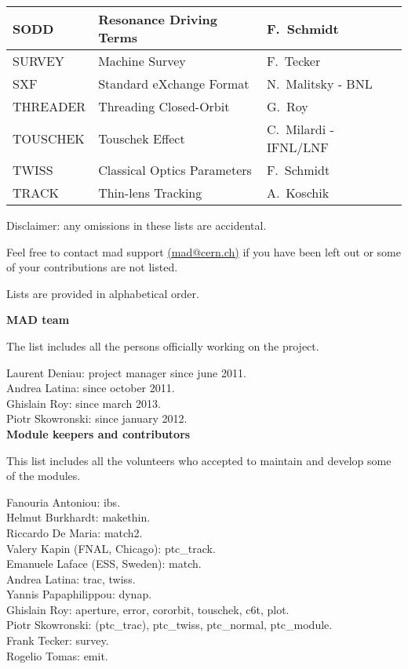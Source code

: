 \begin{table}[H]
\begin{center}
\begin{tabular}{|l|l|l|}
      SODD               &Resonance Driving Terms     &F.~Schmidt \\\hline
      SURVEY             &Machine Survey              &F.~Tecker \\\hline
      SXF                &Standard eXchange Format    &N.~Malitsky - BNL  \\\hline
      THREADER           &Threading Closed-Orbit      &G.~Roy \\\hline
      TOUSCHEK           &Touschek Effect             &C.~Milardi - IFNL/LNF \\\hline
      TWISS              &Classical Optics Parameters &F.~Schmidt \\\hline
      TRACK              &Thin-lens Tracking          &A.~Koschik \\\hline      
    \end{tabular}
    \label{Module_Keepers}
  \end{center}
\end{table}


Disclaimer: any omissions in these lists are accidental. 

Feel free to contact mad support
\href{mailto:mad.support@cern.ch}{(mad@cern.ch)} 
if you have been left out or some of your contributions are not listed. 

Lists are provided in alphabetical order.

{\bf MAD team}

The list includes all the persons officially working on the \madx project.

Laurent Deniau: project manager since june 2011.\\
Andrea Latina: since october 2011.\\
Ghislain Roy: since march 2013.\\
Piotr Skowronski: since january 2012.\\


{\bf Module keepers and contributors}

This list includes all the volunteers who accepted to maintain and
develop some of the \madx modules.

Fanouria Antoniou: ibs.\\
Helmut Burkhardt: makethin.\\
Riccardo De Maria: match2.\\
Valery Kapin (FNAL, Chicago): ptc\_track.\\
Emanuele Laface (ESS, Sweden): match.\\
Andrea Latina: trac, twiss.\\
Yannis Papaphilippou: dynap.\\
Ghislain Roy: aperture, error, cororbit, touschek, c6t, plot.\\
Piotr Skowronski: (ptc\_trac), ptc\_twiss, ptc\_normal, ptc\_module.\\
Frank Tecker: survey.\\
Rogelio Tomas: emit.


